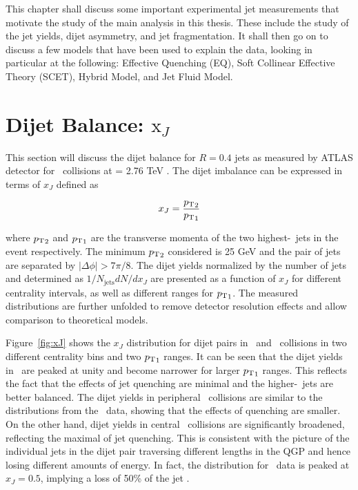 This chapter shall discuss some important experimental jet measurements that motivate the study of the main analysis in this thesis. These include the study of the jet yields, dijet asymmetry, and jet fragmentation. It shall then go on to discuss a few models that have been used to explain the data, looking in particular at the following: Effective Quenching (EQ), Soft Collinear Effective Theory (SCET), Hybrid Model, and Jet Fluid Model.


\section{Dijet Balance: $\mathrm{x}_{J}$}
\label{sec:xj}
This section will discuss the dijet balance for $R = 0.4$ jets as measured by ATLAS detector for \pbpb\ collisions at \sqrtsnn = 2.76 TeV \cite{Aaboud:2017eww}. The dijet imbalance can be expressed in terms of $x_J$ defined as

\begin{align}
x_J =  \frac{\mbox{$p_{\mathrm{T}}$}_2}{\mbox{$p_{\mathrm{T}}$}_1}
\end{align}

where $\mbox{$p_{\mathrm{T}}$}_2$ and $\mbox{$p_{\mathrm{T}}$}_1$ are the transverse momenta of the two highest-\pt\ jets in the event respectively. The minimum $\mbox{$p_{\mathrm{T}}$}_2$ considered is 25 GeV and the pair of jets are separated by $|\Delta\phi| > 7\pi/8$. The dijet yields normalized by the number of jets and determined as $1/N_\mathrm{jets} dN/dx_J$ are presented as a function of $x_J$ for different centrality intervals, as well as different ranges for $\mbox{$p_{\mathrm{T}}$}_1$. The measured distributions are further unfolded to remove detector resolution effects and allow comparison to theoretical models.

Figure~\ref{fig:xJ} shows the $x_J$ distribution for dijet pairs in \pp\ and \pbpb\ collisions in two different centrality bins and two $\mbox{$p_{\mathrm{T}}$}_1$ ranges. It can be seen that the dijet yields in \pp\ are peaked at unity and become narrower for larger $\mbox{$p_{\mathrm{T}}$}_1$ ranges. This reflects the fact that the effects of jet quenching are minimal and the higher-\pt\ jets are better balanced. The dijet yields in peripheral \pbpb\ collisions are similar to the distributions from the \pp\ data, showing that the effects of quenching are smaller. On the other hand, dijet yields in central \pbpb\ collisions are significantly broadened, reflecting the maximal  of jet quenching. This is consistent with the picture of the individual jets in the dijet pair traversing different lengths in the QGP and hence losing different amounts of energy. In fact, the distribution for \pbpb\ data is peaked at $x_J = 0.5$, implying a loss of 50\% of the jet \pt.

